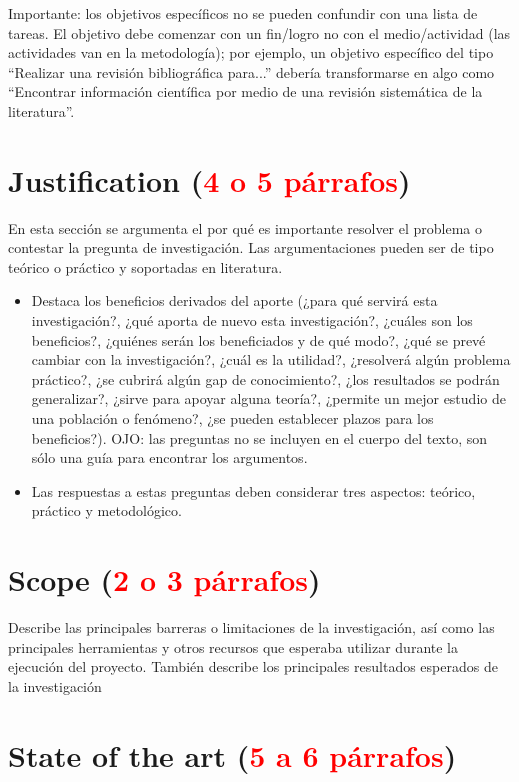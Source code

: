 \documentclass[12pt,letterpaper]{article}
\begin{document}
Importante: los objetivos específicos no se pueden confundir con una lista de
tareas. El objetivo debe comenzar con un fin/logro no con el medio/actividad
(las actividades van en la metodología); por ejemplo, un objetivo específico
del tipo ``Realizar una revisión bibliográfica para...'' debería transformarse
en algo como ``Encontrar información científica por medio de una revisión
sistemática de la literatura''.


\section{Justification (\textcolor{red}{4 o 5 párrafos})}

En esta sección se argumenta el por qué es importante resolver el problema o
contestar la pregunta de investigación. Las argumentaciones pueden ser de tipo
teórico o práctico y soportadas en literatura.

\begin{itemize}
\item Destaca los beneficios derivados del aporte (¿para qué servirá esta investigación?, ¿qué aporta de nuevo esta investigación?, ¿cuáles son los beneficios?, ¿quiénes serán los beneficiados y de qué modo?, ¿qué se prevé cambiar con la investigación?, ¿cuál es la utilidad?, ¿resolverá algún problema práctico?, ¿se cubrirá algún gap de conocimiento?, ¿los resultados se podrán generalizar?, ¿sirve para apoyar alguna teoría?, ¿permite un mejor estudio de una población o fenómeno?, ¿se pueden establecer plazos para los beneficios?). OJO: las preguntas no se incluyen en el cuerpo del texto, son sólo una guía para encontrar los argumentos.
\item Las respuestas a estas preguntas deben considerar tres aspectos: teórico, práctico y metodológico.
\end{itemize}


\section{Scope (\textcolor{red}{2 o 3 párrafos})}

Describe las principales barreras o limitaciones de la investigación,
así como las principales herramientas y otros recursos que esperaba utilizar
durante la ejecución del proyecto. También describe los principales
resultados esperados de la investigación

\section{State of the art (\textcolor{red}{5 a 6 párrafos})}
\end{document}
